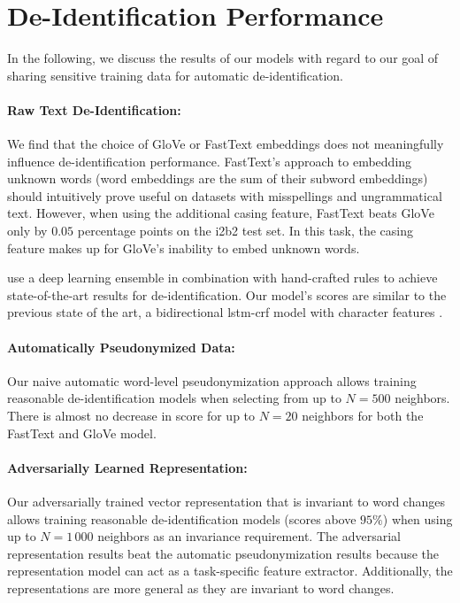 \section{De-Identification Performance}

In the following, we discuss the results of our models with regard to our goal of sharing sensitive training data for automatic de-identification.

\paragraph{Raw Text De-Identification:}
%
We find that the choice of GloVe or FastText embeddings does not meaningfully influence de-identification performance.
%
FastText's approach to embedding unknown words (word embeddings are the sum of their subword embeddings) should intuitively prove useful on datasets with misspellings and ungrammatical text.
%
However, when using the additional casing feature, FastText beats GloVe only by $0.05$ percentage points on the i2b2 test set.
%
In this task, the casing feature makes up for GloVe's inability to embed unknown words.

%
\citet{liu2017identification} use a deep learning ensemble in combination with hand-crafted rules to achieve state-of-the-art results for de-identification.
%
Our model's scores are similar to the previous state of the art, a bidirectional \ac{lstm}-\ac{crf} model with character features \citep{dernoncourt2017identification}.

\paragraph{Automatically Pseudonymized Data:}
%
Our naive automatic word-level pseudonymization approach allows training reasonable de-identification models when selecting from up to $N=500$ neighbors.
%
There is almost no decrease in \fone score for up to $N = 20$ neighbors for both the FastText and GloVe model.

\paragraph{Adversarially Learned Representation:}
%
Our adversarially trained vector representation that is invariant to word changes allows training reasonable de-identification models (\fone scores above $95\%$) when using up to $N=1\,000$ neighbors as an invariance requirement.
%
The adversarial representation results beat the automatic pseudonymization results because the representation model can act as a task-specific feature extractor.
%
Additionally, the representations are more general as they are invariant to word changes.


